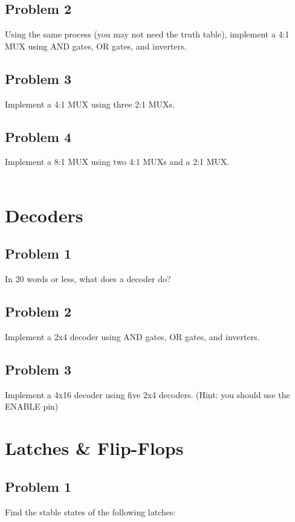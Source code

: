 \documentclass{article}
\begin{document}
\subsection*{Problem 2}
Using the same process (you may not need the truth table), implement a 4:1 MUX using AND gates, OR gates, and inverters.


\subsection*{Problem 3}
Implement a 4:1 MUX using three 2:1 MUXs.


\subsection*{Problem 4}
Implement a 8:1 MUX using two 4:1 MUXs and a 2:1 MUX.
\\ \\
\section*{Decoders}
\subsection*{Problem 1}
In 20 words or less, what does a decoder do?

\subsection*{Problem 2}
Implement a 2x4 decoder using AND gates, OR gates, and inverters.

\subsection*{Problem 3}
Implement a 4x16 decoder using five 2x4 decoders. (Hint: you should use the ENABLE pin)

\newpage
\section*{Latches \& Flip-Flops}
\subsection*{Problem 1}
Find the stable states of the following latches: \\
\end{document}
